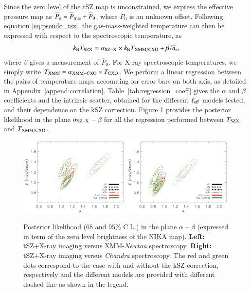 \documentclass[twocolumn,traditabstract]{aa}
\newcommand{\ccor}[1]{\textcolor{Mypink}{#1}}
\def\TSZ {T_{\rm SZX}}
\def \TXC {T_{\rm CXO}}
\def \TXX {T_{\rm XMM}}
\def \TXXC {T_{\rm XMM/CXO}}
\begin{document}
Since the zero level of the tSZ map is unconstrained, we express the effective pressure map as $\overline{P}_{\rm e} = \overline{P}_{\rm true} + \overline{P}_0$, where $\overline{P}_0$ is an unknown offset. Following equation \ref{eq:pseudo_tsz}, the gas-mass-weighted temperature can then be expressed with respect to the spectroscopic temperature, as
\begin{equation}
k_{\rm B} \TSZ = \alpha_{\rm SZ-X} \times k_{\rm B} \TXXC+ {\beta}/{\overline{n}_{\rm e}},
\label{eq:TSZ_TX_regression}
\end{equation}
where $\beta$ gives a measurement of $\overline{P}_0$. For X-ray spectroscopic temperatures, we simply write $\TXX = \alpha_{\rm XMM-CXO} \times \TXC$. We perform a linear regression between the pairs of temperature maps accounting for error bars on both axis, as detailed in Appendix~\ref{append:correlation}. Table~\ref{tab:regression_coeff} gives the $\alpha $ \ccor{and $\beta$} coefficients \ccor{and the intrinsic scatter}, obtained for the different $\ell_{\rm eff}$ models tested, and their dependence on the kSZ correction. \ccor{Figure \ref{fig:T_SZ_T_X_posterior} provides the posterior likelihood in the plane $\alpha_{\rm SZ-X}$ -- $\beta$ for all the regression performed between $\TSZ$ and ${T}_{\rm XMM/CXO}$.}

\begin{figure}[h]
\centering
\includegraphics[width=0.49\textwidth]{Figure/Fit_Results_Likelihood_gmw-XMM.pdf}
\includegraphics[width=0.49\textwidth]{Figure/Fit_Results_Likelihood_gmw-CXO.pdf}
\caption{\footnotesize\ccor{Posterior likelihood (68 and 95\% C.L.) in the plane $\alpha$ -- $\beta$ (expressed in term of the zero level brightness of the NIKA map). {\bf Left:} tSZ+X-ray imaging versus XMM-\textit{Newton} spectroscopy. {\bf Right:} tSZ+X-ray imaging versus \textit{Chandra} spectroscopy. The red and green dots correspond to the case with and without the kSZ correction, respectively and the different models are provided with different dashed line as shown in the legend.}}
\label{fig:T_SZ_T_X_posterior}
\end{figure}
\end{document}
